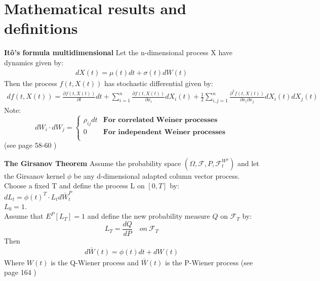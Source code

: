 
\chapter{Mathematical results and definitions} %

\label{AppendixB} %

\begin{theorem}\label{Ito}
\textbf{Itô's formula multidimensional} Let the n-dimensional process X have dynamics given by:
\begin{align}
dX(t)=\mu(t)dt+\sigma(t)dW(t)
\end{align}
Then the process $f(t,X(t))$ has stochastic differential given by:
\begin{equation}
\begin{split}
df(t,X(t))=\frac{\partial f(t,X(t))}{\partial t}  dt + \sum_{i=1}^{n} \frac{\partial f(t,X(t))}{\partial x_i}  dX_i(t) + \frac{1}{2} \sum_{i,j=1}^{n} \frac{\partial^2 f(t,X(t))}{\partial x_i \partial x_j}  dX_i(t)dX_j(t)  
\end{split}
\end{equation}
Note: \[ dW_i \cdot dW_j= \begin{cases} 
      \rho_{ij}dt & \textbf{For correlated Weiner processes} \\
      0 & \textbf{For independent Weiner processes} \\
   \end{cases}
\]
(see page 58-60 \parencite{finKont})
\end{theorem}

\begin{theorem}\label{Girsanov}
\textbf{The Girsanov Theorem} 
Assume the probability space $(\Omega, \mathcal{F}, P, \mathcal{F}_t^{W^p})$ and let the Girsanov kernel $\phi$ be any d-dimensional adapted column vector process. Choose a fixed T and define the process L on $[0,T]$ by:\\
$dL_t=\phi(t)^T\cdot L_t d\bar{W}_t^P$\\
$L_0=1$.\\
Assume that $E^P[L_T]=1$ and define the new probability measure $Q$ on $\mathcal{F}_T$ by:\\
$$L_T=\frac{dQ}{dP} \quad on \ \mathcal{F}_T$$
Then
\begin{align}
d\bar{W}(t)=\phi(t)dt + dW(t)
\end{align}
Where $W(t)$ is the Q-Wiener process and $\bar{W}(t)$ is the P-Wiener process
(see page 164 \parencite{finKont})
\end{theorem}

